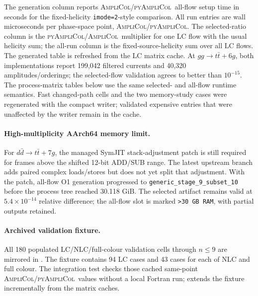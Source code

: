 \documentclass[10pt]{article}
\newcommand{\AC}{\textsc{AmpliCol}}
\newcommand{\PAC}{\textsc{pyAmpliCol}}
\begin{document}
\noindent\footnotesize The generation column reports \AC/\PAC\ all-flow setup
time in seconds for the fixed-helicity \texttt{imode=2}-style comparison.  All
run entries are wall microseconds per phase-space point, \AC/\PAC.  The
selected-ratio column is the \PAC/\AC\ multiplier for one LC flow with the
usual helicity sum; the all-run column is the fixed-source-helicity sum over
all LC flows.  The generated table is refreshed from the LC matrix cache.  At
\(gg\to t\bar t+6g\), both implementations report 199,042 filtered currents
and 40,320 amplitudes/orderings; the selected-flow validation agrees to better
than \(10^{-15}\).  The process-matrix tables below use the same selected- and
all-flow runtime semantics.  Fast changed-path cells and the two memory-study
cases were regenerated with the compact writer; validated expensive entries
that were unaffected by the writer remain in the cache.
\paragraph{High-multiplicity AArch64 memory limit.}
For \(d\bar d\to t\bar t+7g\), the managed SymJIT stack-adjustment patch is
still required for frames above the shifted 12-bit ADD/SUB range.  The latest
upstream branch adds paired complex loads/stores but does not yet split that
adjustment.  With the patch, all-flow O1 generation progressed to
\texttt{generic\_stage\_9\_subset\_10} before the process tree reached
30.118 GiB.  The selected artifact remains valid at
\(5.4\times10^{-14}\) relative difference; the all-flow slot is marked
\texttt{>30 GB RAM}, with partial outputs retained.







\paragraph{Archived validation fixture.}
All 180 populated LC/NLC/full-colour validation cells through \(n\le9\) are
mirrored in .  The fixture
contains 94 LC cases and 43 cases for each of NLC and full colour.  The
integration test checks those cached same-point \AC/\PAC\ values without a
local Fortran run;  extends the
fixture incrementally from the matrix caches.
\end{document}
